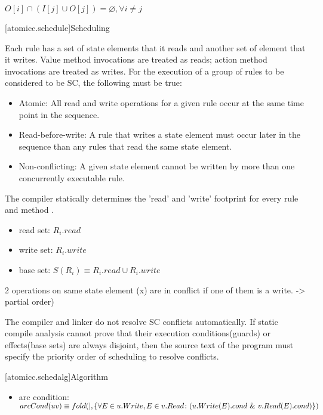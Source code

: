 $O[i] \cap (I[j] \cup O[j]) = \varnothing, \forall i \neq j $
\cite[Sec.~7.3]{GrayR93}

[atomicc.schedule]{Scheduling}

Each rule has a set of state elements that it reads and another set of element that it writes.
Value method invocations are treated as reads; action method invocations are treated as writes.
For the execution of a group of rules to be considered to be SC, the following must
be true:
\begin{itemize}
\item Atomic: All read and write operations for a given rule occur at the same time point in the sequence.
\item Read-before-write:  A rule that writes a state element must occur later in the sequence
than any rules that read the same state element.
\item Non-conflicting: A given state element cannot be written by more than one concurrently executable rule.
\end{itemize}

The compiler statically determines the 'read' and 'write'
footprint for every rule and method \cite[Sec.~10.1.2]{OV11} \cite{doi:10.1137/0213032}.
\begin{itemize}
\item read set: $R_{i}.read$
\item write set: $R_{i}.write$
\item base set: $S(R_{i}) \equiv R_{i}.read \cup R_{i}.write$
\end{itemize}
\cite[Sec.~10.1.2]{OV11}
\cite[Sec.~11.1]{OV11}  2 operations on same state element (x) are in conflict if
one of them is a write. -> partial order)

The compiler and linker do not resolve SC conflicts automatically.
If static compile analysis cannot prove that their execution conditions(guards) or
effects(base sets) are always disjoint,
then the source text of the program must specify the priority order of scheduling
to resolve conflicts.

[atomicc.schedalg]{Algorithm}
\begin{itemize}
\item arc condition: $arcCond(uv) \equiv
\newline
      fold (|, \{ \forall E \in u.Write, E \in v.Read \colon (u.Write(E).cond\ \&\ v.Read(E).cond) \})$
\end{itemize}

